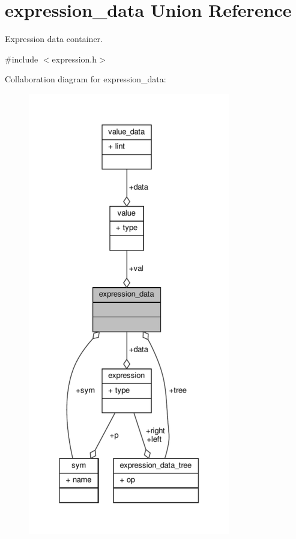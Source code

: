 \hypertarget{unionexpression__data}{}\section{expression\+\_\+data Union Reference}
\label{unionexpression__data}


Expression data container.  




{\ttfamily \#include $<$expression.\+h$>$}



Collaboration diagram for expression\+\_\+data\+:
\nopagebreak
\begin{figure}[H]
\begin{center}
\leavevmode
\includegraphics[height=550pt]{unionexpression__data__coll__graph}
\end{center}
\end{figure}
